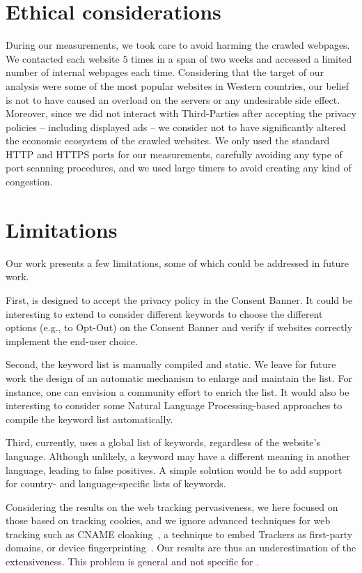 \section{Ethical considerations}
\label{sec:ethics}

During our measurements, we took care to avoid harming the crawled webpages. We contacted each website $5$ times in a span of two weeks and accessed a limited number of internal webpages each time. Considering that the target of our analysis were some of the most popular websites in Western countries, our belief is not to have caused an overload on the servers or any undesirable side effect. Moreover, since we did not interact with Third-Parties after accepting the privacy policies -- including displayed ads -- we consider not to have significantly altered the economic ecosystem of the crawled websites. We only used the standard HTTP and HTTPS ports for our measurements, carefully avoiding any type of port scanning procedures, and we used large timers to avoid creating any kind of congestion.

\section{Limitations}
\label{sec:limits}

Our work presents a few limitations, some of which could be addressed in future work.

First, \TOOL is designed to accept the privacy policy in the Consent Banner. It could be interesting to extend \TOOL to consider different keywords to choose the different options (e.g., to Opt-Out) on the Consent Banner and verify if websites correctly implement the end-user choice.

Second, the keyword list is manually compiled and static. We leave for future work the design of an automatic mechanism to enlarge and maintain the list. For instance, one can envision a community effort to enrich the list. It would also be interesting to consider some Natural Language Processing-based approaches to compile the keyword list automatically.

Third, currently, \TOOL uses a global list of keywords, regardless of the website's language. Although unlikely, a keyword may have a different meaning in another language, leading to false positives. A simple solution would be to add support for country- and language-specific lists of keywords.

Considering the results on the web tracking pervasiveness, we here focused on those based on tracking cookies, and we ignore advanced techniques for web tracking such as CNAME cloaking~\cite{dao2021}, a technique to embed Trackers as first-party domains, or device fingerprinting~\cite{rizzo2021unveiling}. Our results are thus an underestimation of the extensiveness. This problem is general and not specific for \TOOL.

